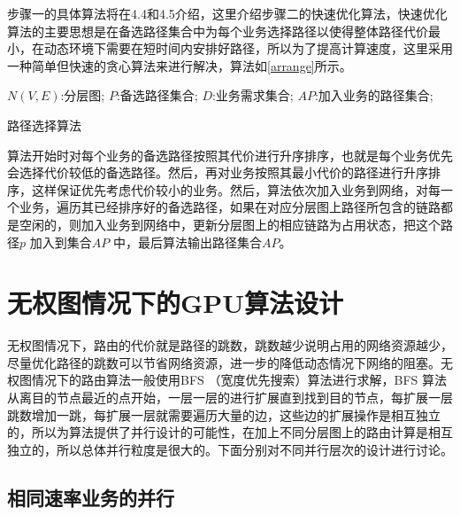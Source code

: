 步骤一的具体算法将在4.4和4.5介绍，这里介绍步骤二的快速优化算法，快速优化算法的主要思想是在备选路径集合中为每个业务选择路径以使得整体路径代价最小，在动态环境下需要在短时间内安排好路径，所以为了提高计算速度，这里采用一种简单但快速的贪心算法来进行解决，算法如\ref{arrange}所示。
\begin{algorithm}[htb]
\begin{algorithmic}[1]
\Require
$N(V,E)$:分层图;
$P$:备选路径集合;
$D$:业务需求集合;
\Ensure
$AP$:加入业务的路径集合;
\EndFor
{}
\EndIf
\EndFor
\EndFor
\end{algorithmic}
\caption{路径选择算法}
\label{arrange}
\end{algorithm}

算法开始时对每个业务的备选路径按照其代价进行升序排序，也就是每个业务优先会选择代价较低的备选路径。然后，再对业务按照其最小代价的路径进行升序排序，这样保证优先考虑代价较小的业务。然后，算法依次加入业务到网络，对每一个业务，遍历其已经排序好的备选路径，如果在对应分层图上路径所包含的链路都是空闲的，则加入业务到网络中，更新分层图上的相应链路为占用状态，把这个路径$p$ 加入到集合$AP$ 中，最后算法输出路径集合$AP$。
\section{无权图情况下的GPU算法设计}

无权图情况下，路由的代价就是路径的跳数，跳数越少说明占用的网络资源越少，尽量优化路径的跳数可以节省网络资源，进一步的降低动态情况下网络的阻塞。无权图情况下的路由算法一般使用BFS （宽度优先搜索）算法进行求解，BFS 算法从离目的节点最近的点开始，一层一层的进行扩展直到找到目的节点，每扩展一层跳数增加一跳，每扩展一层就需要遍历大量的边，这些边的扩展操作是相互独立的，所以为算法提供了并行设计的可能性，在加上不同分层图上的路由计算是相互独立的，所以总体并行粒度是很大的。下面分别对不同并行层次的设计进行讨论。
\subsection {相同速率业务的并行}

